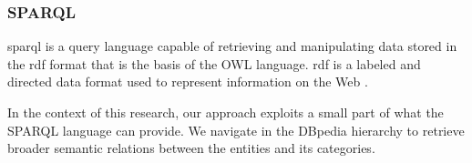 \subsubsection{\hspace*{3pt} SPARQL}

\gls{sparql} is a query language capable of retrieving and manipulating data stored in the \gls{rdf} format that is the basis of the OWL language. \gls{rdf} is a labeled and directed data format used to represent information on the Web \cite{prud2008sparql}. 







In the context of this research, our approach exploits a small part of what the SPARQL language can provide. We  navigate in the DBpedia hierarchy to retrieve broader semantic relations between the entities and its categories. 






